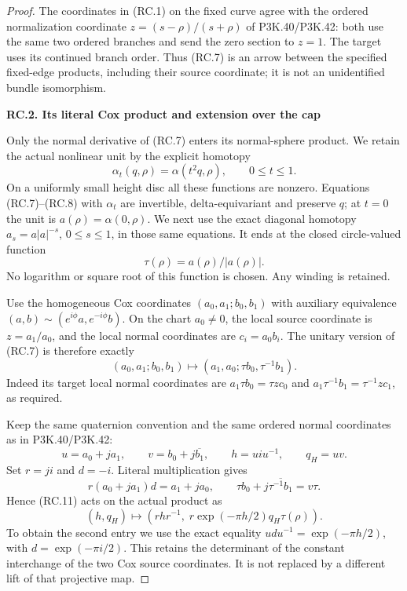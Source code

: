 \begin{proof}
The coordinates in (RC.1) on the fixed curve agree with the ordered
normalization coordinate \(z=(s-\rho)/(s+\rho)\) of P3K.40/P3K.42:
both use the same two ordered branches and send the zero section to
\(z=1\). The target uses its continued branch order. Thus (RC.7) is
an arrow between the specified fixed-edge products, including their
source coordinate; it is not an unidentified bundle isomorphism.

\par

\medskip\noindent\textbf{RC.2. Its literal Cox product and extension over the cap}

\par\nobreak

Only the normal derivative of (RC.7) enters its normal-sphere product.
We retain the actual nonlinear unit by the explicit homotopy
\[
 \alpha_t(q,\rho)=\alpha(t^2q,\rho),\qquad 0\le t\le1.
                                                               \tag{RC.9}
\]
On a uniformly small height disc all these functions are nonzero.
Equations (RC.7)--(RC.8) with \(\alpha_t\) are invertible,
delta-equivariant and preserve \(q\); at \(t=0\) the unit is
\(a(\rho)=\alpha(0,\rho)\). We next use the exact diagonal homotopy
\(a_s=a|a|^{-s}\), \(0\le s\le1\), in those same equations.
It ends at the closed circle-valued function
\[
                         \tau(\rho)=a(\rho)/|a(\rho)|. \tag{RC.10}
\]
No logarithm or square root of this function is chosen. Any winding
is retained.

Use the homogeneous Cox coordinates \((a_0,a_1;b_0,b_1)\) with
auxiliary equivalence
\((a,b)\sim(e^{i\phi}a,e^{-i\phi}b)\). On the chart \(a_0\ne0\),
the local source coordinate is \(z=a_1/a_0\), and the local normal
coordinates are \(c_i=a_0b_i\). The unitary version of (RC.7) is
therefore exactly
\[
 (a_0,a_1;b_0,b_1)
       \longmapsto(a_1,a_0;\tau b_0,\tau^{-1}b_1).
                                                               \tag{RC.11}
\]
Indeed its target local normal coordinates are
\(a_1\tau b_0=\tau zc_0\) and
\(a_1\tau^{-1}b_1=\tau^{-1}zc_1\), as required.

Keep the same quaternion convention and the same ordered normal
coordinates as in P3K.40/P3K.42:
\[
 u=a_0+ja_1,\qquad v=b_0+j\overline{b_1},\qquad
 h=uiu^{-1},\qquad q_H=uv.
\]
Set \(r=ji\) and \(d=-i\). Literal multiplication gives
\[
 r(a_0+ja_1)d=a_1+ja_0,
 \qquad
 \tau b_0+j\overline{\tau^{-1}b_1}=v\tau.
                                                               \tag{RC.12}
\]
Hence (RC.11) acts on the actual product as
\[
 (h,q_H)\longmapsto
 \left(rhr^{-1},\;r\exp(-\pi h/2)q_H\tau(\rho)\right).
                                                               \tag{RC.13}
\]
To obtain the second entry we use the exact equality
\(udu^{-1}=\exp(-\pi h/2)\), with \(d=\exp(-\pi i/2)\).
This retains the determinant of the constant interchange of the two
Cox source coordinates. It is not replaced by a different lift of
that projective map.


\end{proof}

